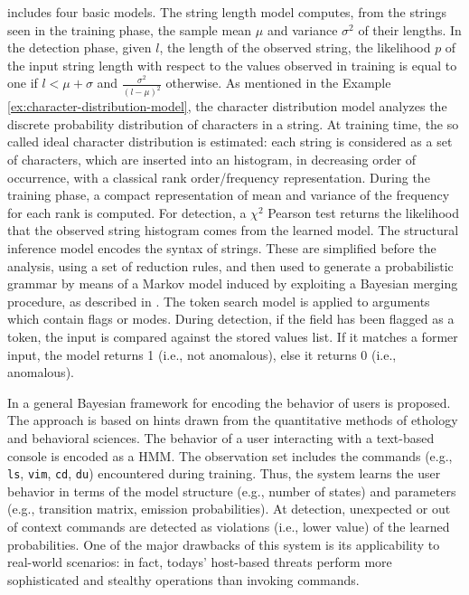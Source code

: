 \LibAnomaly includes four basic models. The string length model
computes, from the strings seen in the training phase, the sample mean
$\mu$ and variance $\sigma^2$ of their lengths. In the detection
phase, given $l$, the length of the observed string, the likelihood
$p$ of the input string length with respect to the values observed in
training is equal to one if $l < \mu + \sigma$ and
$\frac{\sigma^2}{(l-\mu)^2}$ otherwise. As mentioned in the Example
\ref{ex:character-distribution-model}, the character distribution
model analyzes the discrete probability distribution of characters in
a string. At training time, the so called ideal character distribution
is estimated: each string is considered as a set of characters, which
are inserted into an histogram, in decreasing order of occurrence,
with a classical rank order/frequency representation. During the
training phase, a compact representation of mean and variance of the
frequency for each rank is computed. For detection, a $\chi^2$ Pearson
test returns the likelihood that the observed string histogram comes
from the learned model. The structural inference model encodes the
syntax of strings. These are simplified before the analysis, using a
set of reduction rules, and then used to generate a probabilistic
grammar by means of a Markov model induced by exploiting a Bayesian
merging procedure, as described in \citep{stolcke:icsi1994:merging,
stolcke93hidden, InducingProbabilisticGrammarsMerging}. The token
search model is applied to arguments which contain flags or
modes. During detection, if the field has been flagged as a token, the
input is compared against the stored values list. If it matches a
former input, the model returns 1 (i.e., not anomalous), else it
returns 0 (i.e., anomalous).

In \citep{zanero-ethology} a general Bayesian framework for encoding
the behavior of users is proposed. The approach is based on hints
drawn from the quantitative methods of ethology and behavioral
sciences. The behavior of a user interacting with a text-based console
is encoded as a \ac{HMM}. The observation set includes the commands
(e.g., \texttt{ls}, \texttt{vim}, \texttt{cd}, \texttt{du})
encountered during training. Thus, the system learns the user behavior
in terms of the model structure (e.g., number of states) and
parameters (e.g., transition matrix, emission probabilities). At
detection, unexpected or out of context commands are detected as
violations (i.e., lower value) of the learned probabilities. One of
the major drawbacks of this system is its applicability to real-world
scenarios: in fact, todays' host-based threats perform more
sophisticated and stealthy operations than invoking commands.

